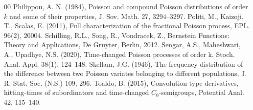 \documentclass[12pt, twoside, english, headsepline]{article}
\theoremstyle{definition} %
\numberwithin{equation}{section} %
\begin{document}
{\begin{thebibliography}{00}
%
Philippou, A. N. (1984), Poisson and compound Poisson distributions of order $k$ and some of their properties, J. Sov. Math. 27, 3294--3297.
%
%
%
Politi, M., Kaizoji, T., Scalas, E. (2011), Full characterization of the fractional Poisson process, EPL. 96(2), 20004.
%
%
Schilling, R.L., Song, R., Vondracek, Z., Bernstein Functions: Theory and Applications, De Gruyter, Berlin, 2012.
%
Sengar, A.S., Maheshwari, A., Upadhye, N.S. (2020), Time-changed Poisson processes of order k. Stoch. Anal. Appl. 38(1), 124--148.
%
%
Skellam, J.G. (1946), The frequency distribution of the difference between two Poisson variates belonging to
different populations, J. R. Stat. Soc. (N.S.) 109, 296.
%
Toaldo, B. (2015), Convolution-type derivatives, hitting-times of subordinators and time-changed $C_0$-semigroups, Potential Anal. 42, 115--140.


\end{thebibliography}}
\end{document}
